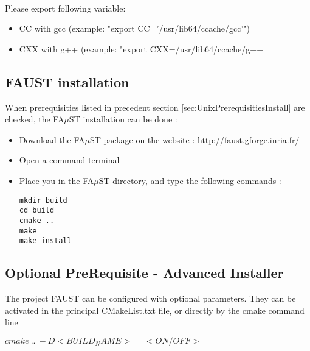 \paragraph{}Please export following variable:
\begin{itemize}
\item CC with gcc (example: "export CC='/usr/lib64/ccache/gcc'") 
\item CXX with g++ (example: "export CXX=/usr/lib64/ccache/g++
\end{itemize}


\subsection{FAUST installation}\label{sec:UnixFaustInstall}
When prerequisities listed in precedent section \ref{sec:UnixPrerequisitiesInstall} are checked, the FA$\mu$ST installation can be done : 

\begin{itemize}
\item Download the FA$\mu$ST package on the website :  \url{http://faust.gforge.inria.fr/}
\item Open a command terminal
\item Place you in the FA$\mu$ST directory, and type the following commands : 
\begin{lstlisting}
mkdir build
cd build
cmake ..
make
make install
\end{lstlisting}
\end{itemize}

\subsection{Optional PreRequisite - Advanced Installer}\label{sec:UnixOptionalInstall}

The project FAUST can be configured with optional parameters. They can be activated in the principal CMakeList.txt file, or directly by  the cmake command line

$cmake\ ..\ -D<BUILD_NAME>=<ON/OFF>$

